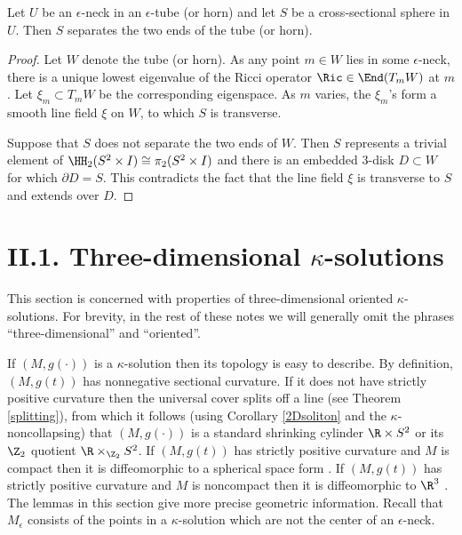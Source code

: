 \begin{lemma}
  \label{lem:kl-notation-terminology-neck-geometry-lemma}

Let $U$ be
an $\epsilon$-neck in an $\epsilon$-tube (or horn) and let
$S$ be a cross-sectional
sphere in $U$. Then $S$ separates the two ends of the tube (or horn).
\end{lemma}
\begin{proof}
Let $W$ denote the tube (or horn).
As any point $m \in W$ lies in some $\epsilon$-neck,
there is a unique lowest eigenvalue of the Ricci operator
$\Ric  \in \End(T_m W)$ at $m$. Let $\xi_m \subset T_mW$ be the
corresponding eigenspace.  As $m$ varies, the
$\xi_m$'s form a smooth
line field $\xi$ on $W$, to which $S$ is transverse.

Suppose that $S$ does not separate the two ends of $W$.
Then $S$ represents a trivial element of
$\HH_2(S^2 \times I) \cong \pi_2(S^2 \times I)$ and
there is an embedded $3$-disk $D \subset W$ for which
$\partial D = S$. This contradicts the fact that
the line field $\xi$ is transverse to $S$ and extends over $D$.
\end{proof}


\section{II.1. Three-dimensional $\kappa$-solutions} \label{II.1}

This section is concerned with properties of three-dimensional oriented
$\kappa$-solutions. For brevity, in the rest of these notes we will generally omit
the phrases ``three-dimensional'' and ``oriented''.

If $(M, g(\cdot))$ is a $\kappa$-solution then its
topology is easy to describe.  By definition, $(M, g(t))$ has nonnegative
sectional curvature.  If it does not have strictly positive curvature
then the universal cover splits off a line (see Theorem \ref{splitting}),
from which
it follows (using Corollary \ref{2Dsoliton} and the $\kappa$-noncollapsing)
that $(M, g(\cdot))$ is a standard shrinking cylinder
$\R \times S^2$ or its $\Z_2$ quotient $\R \times_{\Z_2} S^2$.
If $(M, g(t))$ has strictly positive curvature and $M$ is compact
then it is diffeomorphic to a spherical space form
\cite{Hamiltonnnnn}.
If $(M, g(t))$ has strictly positive curvature and $M$ is noncompact
then it is diffeomorphic to $\R^3$ \cite{Cheeger-Gromoll}. The lemmas
in this section give more precise geometric information.
Recall that $M_\epsilon$ consists of the points in a $\kappa$-solution
which are not the center of an $\epsilon$-neck.


